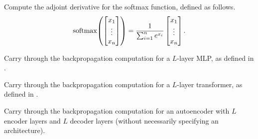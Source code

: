 \documentclass[../../book-main.tex]{subfiles}
\begin{document}
\begin{example}
    Compute the adjoint derivative for the softmax function, defined as follows.
    \begin{equation}
        \softmax\rp{\mat{x_{1} \\ \vdots \\ x_{n}}} = \frac{1}{\sum_{i = 1}^{n}e^{x_{i}}}\mat{x_{1} \\ \vdots \\ x_{n}}.
    \end{equation}
\end{example}

\begin{exercise}
    Carry through the backpropagation computation for a \(L\)-layer MLP, as defined in .
\end{exercise}

\begin{exercise}
    Carry through the backpropagation computation for a \(L\)-layer transformer, as defined in .
\end{exercise}

\begin{exercise}
    Carry through the backpropagation computation for an autoencoder with \(L\) encoder layers and \(L\) decoder layers (without necessarily specifying an architecture).
\end{exercise}



\end{document}
